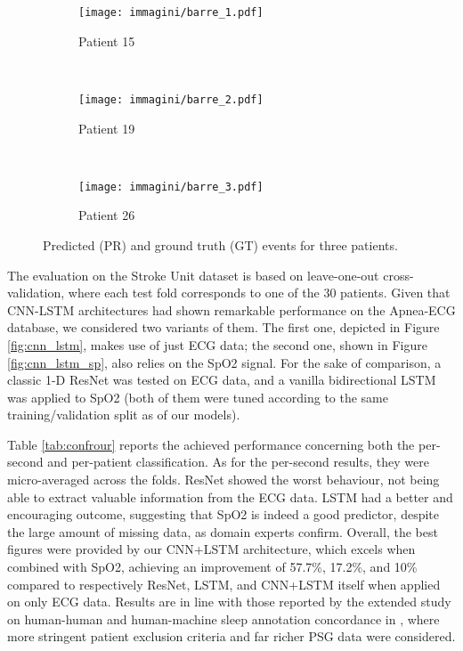 \documentclass[5p,twocolumn,lefttitle]{elsarticle}
\begin{document}
\begin{figure*}[tb]
	\centering
\begin{subfigure}{\textwidth}
    \centering
    \texttt{[image: immagini/barre\_1.pdf]}
    \caption{Patient 15}\label{fig:barre_15} 
\end{subfigure}
\\
\medskip
\begin{subfigure}{\textwidth}
    \centering
    \texttt{[image: immagini/barre\_2.pdf]}
    \caption{Patient 19}\label{fig:barre_19} 
\end{subfigure}
\\
\medskip
\begin{subfigure}{\textwidth}
    \centering
    \texttt{[image: immagini/barre\_3.pdf]}
    \caption{Patient 26}\label{fig:barre_26} 
\end{subfigure}
	\caption{Predicted (PR) and ground truth (GT) events for three patients.}
	\label{fig:barre}
\end{figure*}

The evaluation on the Stroke Unit dataset is based on leave-one-out cross-validation, where each test fold corresponds to one of the 30 patients. 
Given that CNN-LSTM architectures had shown remarkable performance on the Apnea-ECG database, we considered two variants of them. The first one, depicted in Figure \ref{fig:cnn_lstm}, makes use of just ECG data; the second one, shown in Figure \ref{fig:cnn_lstm_sp}, also relies on the SpO2 signal. 
For the sake of comparison, a classic 1-D ResNet \cite{hong2019combining} was tested on ECG data, and a vanilla bidirectional LSTM was applied to SpO2 (both of them were tuned according to the same training/validation split as of our models). 

Table \ref{tab:confrour} reports the achieved performance concerning both the per-second and per-patient classification. 
As for the per-second results, they were micro-averaged across the folds. ResNet showed the worst behaviour, not being able to extract valuable information from the ECG data. LSTM had a better and encouraging outcome, suggesting that SpO2 is indeed a good predictor, despite the large amount of missing data, as domain experts confirm. Overall, the best figures were provided by our CNN+LSTM architecture, which excels when combined with SpO2, achieving an improvement of 57.7\%, 17.2\%, and 10\% compared to respectively ResNet, LSTM, and CNN+LSTM itself when applied on only ECG data. 
Results are in line with those reported by the extended study on human-human and human-machine sleep annotation concordance in \cite{DBLP:conf/embc/ThoreyHAD19}, where more stringent patient exclusion criteria and far richer PSG data were considered. 
\end{document}
